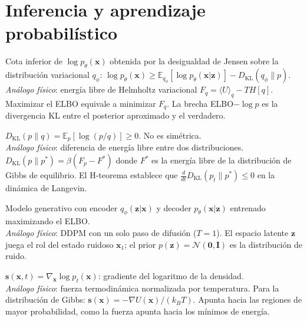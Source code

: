 \section*{Inferencia y aprendizaje probabilístico}

\begin{description}[leftmargin=0pt, labelwidth=!, labelsep=1em,
  font=\normalfont\bfseries, style=nextline]

\item[ELBO --- \textit{Evidence Lower Bound}]
Cota inferior de $\log p_\theta(\bm{x})$ obtenida por la desigualdad de
Jensen sobre la distribución variacional $q_\phi$:
$\log p_\theta(\bm{x}) \geq \mathbb{E}_{q_\phi}[\log p_\theta(\bm{x}|\bm{z})]
- D_{\mathrm{KL}}(q_\phi\|p)$.\\
\emph{Análogo físico}: energía libre de Helmholtz variacional $F_q =
\langle U\rangle_q - TH[q]$. Maximizar el ELBO equivale a minimizar $F_q$.
La brecha ELBO$-\log p$ es la divergencia KL entre el posterior aproximado
y el verdadero.

\item[KL --- \textit{Kullback-Leibler divergence}]
$D_{\mathrm{KL}}(p\|q) = \mathbb{E}_p[\log(p/q)] \geq 0$. No es simétrica.\\
\emph{Análogo físico}: diferencia de energía libre entre dos distribuciones.
$D_{\mathrm{KL}}(p\|p^*) = \beta(F_p - F^*)$ donde $F^*$ es la energía
libre de la distribución de Gibbs de equilibrio. El H-teorema establece que
$\frac{d}{dt}D_{\mathrm{KL}}(p_t\|p^*) \leq 0$ en la dinámica de Langevin.

\item[VAE --- \textit{Variational Autoencoder}]
Modelo generativo con encoder $q_\phi(\bm{z}|\bm{x})$ y decoder
$p_\theta(\bm{x}|\bm{z})$ entrenado maximizando el ELBO.\\
\emph{Análogo físico}: DDPM con un solo paso de difusión ($T=1$). El
espacio latente $\bm{z}$ juega el rol del estado ruidoso $\bm{x}_1$; el
prior $p(\bm{z})=\mathcal{N}(\bm{0},\bm{I})$ es la distribución de ruido.

\item[Función de score / \textit{score function}]
$\bm{s}(\bm{x},t) = \nabla_{\bm{x}}\log p_t(\bm{x})$: gradiente del
logaritmo de la densidad.\\
\emph{Análogo físico}: fuerza termodinámica normalizada por temperatura.
Para la distribución de Gibbs: $\bm{s}(\bm{x}) = -\nabla U(\bm{x})/(k_BT)$.
Apunta hacia las regiones de mayor probabilidad, como la fuerza
apunta hacia los mínimos de energía.


\end{description}
